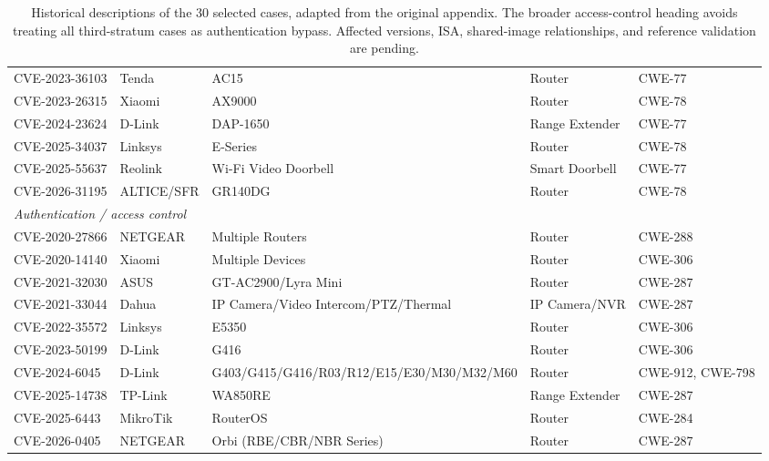 \begin{table}[p]
\begin{minipage}{\textwidth}
\begin{tabular}{p{1.18in}p{0.72in}p{2.35in}p{0.98in}p{0.85in}}
CVE-2023-36103 & Tenda & AC15 & Router & CWE-77 \\
CVE-2023-26315 & Xiaomi & AX9000 & Router & CWE-78 \\
CVE-2024-23624 & D-Link & DAP-1650 & Range Extender & CWE-77 \\
CVE-2025-34037 & Linksys & E-Series & Router & CWE-78 \\
CVE-2025-55637 & Reolink & Wi-Fi Video Doorbell & Smart Doorbell & CWE-77 \\
CVE-2026-31195 & ALTICE/\allowbreak SFR & GR140DG & Router & CWE-78 \\
\midrule
\multicolumn{5}{l}{\textit{Authentication / access control}} \\
CVE-2020-27866 & NETGEAR & Multiple Routers & Router & CWE-288 \\
CVE-2020-14140 & Xiaomi & Multiple Devices & Router & CWE-306 \\
CVE-2021-32030 & ASUS & GT-AC2900/\allowbreak Lyra Mini & Router & CWE-287 \\
CVE-2021-33044 & Dahua & IP Camera/\allowbreak Video Intercom/\allowbreak PTZ/\allowbreak Thermal & IP Camera/\allowbreak NVR & CWE-287 \\
CVE-2022-35572 & Linksys & E5350 & Router & CWE-306 \\
CVE-2023-50199 & D-Link & G416 & Router & CWE-306 \\
CVE-2024-6045 & D-Link & G403/\allowbreak G415/\allowbreak G416/\allowbreak R03/\allowbreak R12/\allowbreak E15/\allowbreak E30/\allowbreak M30/\allowbreak M32/\allowbreak M60 & Router & CWE-912, CWE-798 \\
CVE-2025-14738 & TP-Link & WA850RE & Range Extender & CWE-287 \\
CVE-2025-6443 & MikroTik & RouterOS & Router & CWE-284 \\
CVE-2026-0405 & NETGEAR & Orbi (RBE/\allowbreak CBR/\allowbreak NBR Series) & Router & CWE-287 \\
\bottomrule
\end{tabular}
\caption{Historical descriptions of the 30 selected cases, adapted from
the original appendix. The broader access-control heading avoids treating
all third-stratum cases as authentication bypass. Affected versions, ISA,
shared-image relationships, and reference validation are pending.}
\label{tab:case-details}
\label{tab:cvelist}
\end{minipage}
\end{table}
\clearpage
